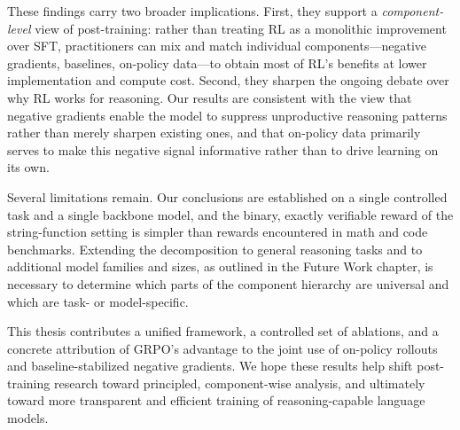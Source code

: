 \documentclass[12pt]{cmuthesis}
\begin{document}
These findings carry two broader implications. First, they support a \emph{component-level} view of post-training: rather than treating RL as a monolithic improvement over SFT, practitioners can mix and match individual components---negative gradients, baselines, on-policy data---to obtain most of RL's benefits at lower implementation and compute cost. Second, they sharpen the ongoing debate over why RL works for reasoning. Our results are consistent with the view that negative gradients enable the model to suppress unproductive reasoning patterns rather than merely sharpen existing ones, and that on-policy data primarily serves to make this negative signal informative rather than to drive learning on its own.

Several limitations remain. Our conclusions are established on a single controlled task and a single backbone model, and the binary, exactly verifiable reward of the string-function setting is simpler than rewards encountered in math and code benchmarks. Extending the decomposition to general reasoning tasks and to additional model families and sizes, as outlined in the Future Work chapter, is necessary to determine which parts of the component hierarchy are universal and which are task- or model-specific.

This thesis contributes a unified framework, a controlled set of ablations, and a concrete attribution of GRPO's advantage to the joint use of on-policy rollouts and baseline-stabilized negative gradients. We hope these results help shift post-training research toward principled, component-wise analysis, and ultimately toward more transparent and efficient training of reasoning-capable language models.


%

\backmatter


\renewcommand{\bibsection}{\chapter{\bibname}}

\end{document}
